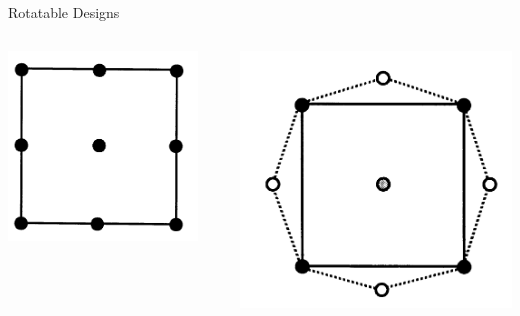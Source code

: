 \documentclass[14pt]{beamer}
\begin{document}
\begin{frame}{Rotatable Designs}
\pause
\begin{columns}
    \begin{column}{0.5\textwidth}
      \includegraphics[width=0.9\textwidth]{3level2factor.png}
      \pause
    \end{column}
    \begin{column}{0.5\textwidth}
      \includegraphics[width=1.1\textwidth]{3level2factorCCI.png}
    \end{column}
  \end{columns}
\end{frame}
\end{document}
